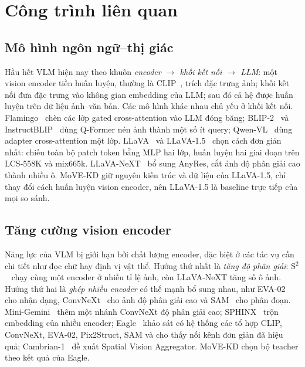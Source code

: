 \section{Công trình liên quan}
\label{sec:related}

\subsection{Mô hình ngôn ngữ--thị giác}

Hầu hết VLM hiện nay theo khuôn \emph{encoder $\rightarrow$ khối kết nối $\rightarrow$ LLM}: một vision encoder tiền huấn luyện, thường là CLIP~\cite{radford2021clip}, trích đặc trưng ảnh; khối kết nối đưa đặc trưng vào không gian embedding của LLM; sau đó cả hệ được huấn luyện trên dữ liệu ảnh--văn bản. Các mô hình khác nhau chủ yếu ở khối kết nối. Flamingo~\cite{alayrac2022flamingo} chèn các lớp gated cross-attention vào LLM đóng băng; BLIP-2~\cite{li2023blip2} và InstructBLIP~\cite{dai2023instructblip} dùng Q-Former nén ảnh thành một số ít query; Qwen-VL~\cite{bai2023qwenvl} dùng adapter cross-attention một lớp. LLaVA~\cite{liu2023llava} và LLaVA-1.5~\cite{liu2024improved} chọn cách đơn giản nhất: chiếu toàn bộ patch token bằng MLP hai lớp, huấn luyện hai giai đoạn trên LCS-558K và mix665k. LLaVA-NeXT~\cite{liu2024llavanext} bổ sung AnyRes, cắt ảnh độ phân giải cao thành nhiều ô. MoVE-KD giữ nguyên kiến trúc và dữ liệu của LLaVA-1.5, chỉ thay đổi cách huấn luyện vision encoder, nên LLaVA-1.5 là baseline trực tiếp của mọi so sánh.

\subsection{Tăng cường vision encoder}

Năng lực của VLM bị giới hạn bởi chất lượng encoder, đặc biệt ở các tác vụ cần chi tiết như đọc chữ hay định vị vật thể. Hướng thứ nhất là \emph{tăng độ phân giải}: S$^2$~\cite{shi2024s2} chạy cùng một encoder ở nhiều tỉ lệ ảnh, còn LLaVA-NeXT tăng số ô ảnh. Hướng thứ hai là \emph{ghép nhiều encoder} có thế mạnh bổ sung nhau, như EVA-02~\cite{fang2024eva02} cho nhận dạng, ConvNeXt~\cite{liu2022convnext} cho ảnh độ phân giải cao và SAM~\cite{kirillov2023sam} cho phân đoạn. Mini-Gemini~\cite{li2024minigemini} thêm một nhánh ConvNeXt độ phân giải cao; SPHINX~\cite{lin2023sphinx} trộn embedding của nhiều encoder; Eagle~\cite{shi2024eagle} khảo sát có hệ thống các tổ hợp CLIP, ConvNeXt, EVA-02, Pix2Struct, SAM và cho thấy nối kênh đơn giản đã hiệu quả; Cambrian-1~\cite{tong2024cambrian} đề xuất Spatial Vision Aggregator. MoVE-KD chọn bộ teacher theo kết quả của Eagle.

